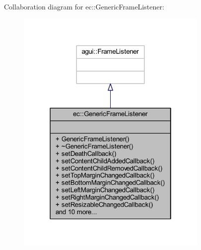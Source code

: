 Collaboration diagram for ec\+:\+:Generic\+Frame\+Listener\+:\nopagebreak
\begin{figure}[H]
\begin{center}
\leavevmode
\includegraphics[width=262pt]{classec_1_1_generic_frame_listener__coll__graph}
\end{center}
\end{figure}
